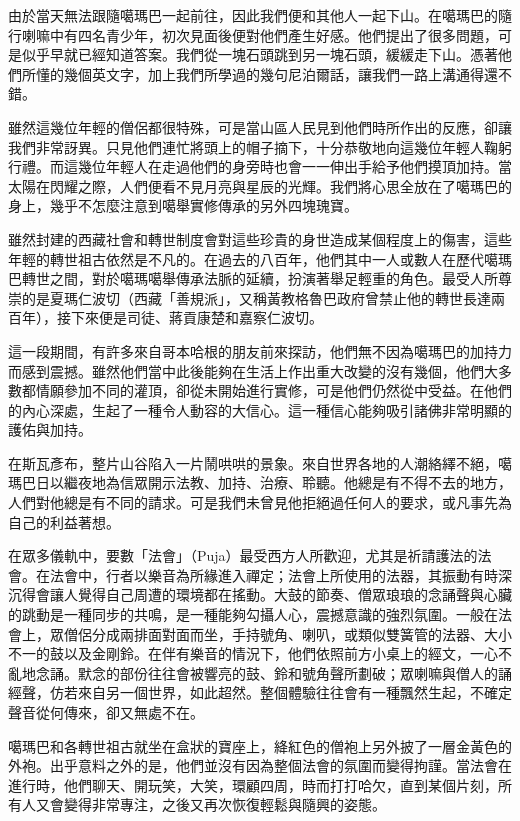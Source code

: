 由於當天無法跟隨噶瑪巴一起前往，因此我們便和其他人一起下山。在噶瑪巴的隨行喇嘛中有四名青少年，初次見面後便對他們產生好感。他們提出了很多問題，可是似乎早就已經知道答案。我們從一塊石頭跳到另一塊石頭，緩緩走下山。憑著他們所懂的幾個英文字，加上我們所學過的幾句尼泊爾話，讓我們一路上溝通得還不錯。

雖然這幾位年輕的僧侶都很特殊，可是當山區人民見到他們時所作出的反應，卻讓我們非常訝異。只見他們連忙將頭上的帽子摘下，十分恭敬地向這幾位年輕人鞠躬行禮。而這幾位年輕人在走過他們的身旁時也會一一伸出手給予他們摸頂加持。當太陽在閃耀之際，人們便看不見月亮與星辰的光輝。我們將心思全放在了噶瑪巴的身上，幾乎不怎麼注意到噶舉實修傳承的另外四塊瑰寶。

雖然封建的西藏社會和轉世制度會對這些珍貴的身世造成某個程度上的傷害，這些年輕的轉世祖古依然是不凡的。在過去的八百年，他們其中一人或數人在歷代噶瑪巴轉世之間，對於噶瑪噶舉傳承法脈的延續，扮演著舉足輕重的角色。最受人所尊崇的是夏瑪仁波切（西藏「善規派」，又稱黃教格魯巴政府曾禁止他的轉世長達兩百年），接下來便是司徒、蔣貢康楚和嘉察仁波切。

這一段期間，有許多來自哥本哈根的朋友前來探訪，他們無不因為噶瑪巴的加持力而感到震撼。雖然他們當中此後能夠在生活上作出重大改變的沒有幾個，他們大多數都情願參加不同的灌頂，卻從未開始進行實修，可是他們仍然從中受益。在他們的內心深處，生起了一種令人動容的大信心。這一種信心能夠吸引諸佛非常明顯的護佑與加持。

在斯瓦彥布，整片山谷陷入一片鬧哄哄的景象。來自世界各地的人潮絡繹不絕，噶瑪巴日以繼夜地為信眾開示法教、加持、治療、聆聽。他總是有不得不去的地方，人們對他總是有不同的請求。可是我們未曾見他拒絕過任何人的要求，或凡事先為自己的利益著想。

在眾多儀軌中，要數「法會」（Puja）最受西方人所歡迎，尤其是祈請護法的法會。在法會中，行者以樂音為所緣進入禪定；法會上所使用的法器，其振動有時深沉得會讓人覺得自己周遭的環境都在搖動。大鼓的節奏、僧眾琅琅的念誦聲與心臟的跳動是一種同步的共鳴，是一種能夠勾攝人心，震撼意識的強烈氛圍。一般在法會上，眾僧侶分成兩排面對面而坐，手持號角、喇叭，或類似雙簧管的法器、大小不一的鼓以及金剛鈴。在伴有樂音的情況下，他們依照前方小桌上的經文，一心不亂地念誦。默念的部份往往會被響亮的鼓、鈴和號角聲所劃破；眾喇嘛與僧人的誦經聲，仿若來自另一個世界，如此超然。整個體驗往往會有一種飄然生起，不確定聲音從何傳來，卻又無處不在。

噶瑪巴和各轉世祖古就坐在盒狀的寶座上，絳紅色的僧袍上另外披了一層金黃色的外袍。出乎意料之外的是，他們並沒有因為整個法會的氛圍而變得拘謹。當法會在進行時，他們聊天、開玩笑，大笑，環顧四周，時而打打哈欠，直到某個片刻，所有人又會變得非常專注，之後又再次恢復輕鬆與隨興的姿態。

